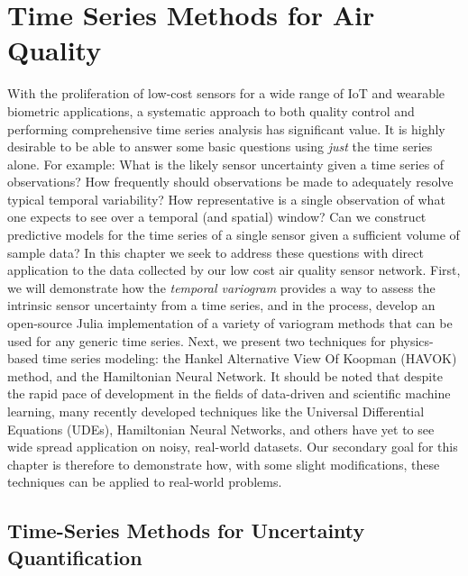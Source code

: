 \chapter{Time Series Methods for Air Quality}

With the proliferation of low-cost sensors for a wide range of IoT and wearable biometric applications, a systematic approach to both quality control and performing comprehensive time series analysis has significant value. It is highly desirable to be able to answer some basic questions using \textit{just} the time series alone. For example: What is the likely sensor uncertainty given a time series of observations? How frequently should observations be made to adequately resolve typical temporal variability? How representative is a single observation of what one expects to see over a temporal (and spatial) window? Can we construct predictive models for the time series of a single sensor given a sufficient volume of sample data? In this chapter we seek to address these questions with direct application to the data collected by our low cost air quality sensor network. First, we will demonstrate how the \textit{temporal variogram} provides a way to assess the intrinsic sensor uncertainty from a time series, and in the process, develop an open-source Julia implementation of a variety of variogram methods that can be used for any generic time series. Next, we present two techniques for physics-based time series modeling: the Hankel Alternative View Of Koopman (HAVOK) method, and the Hamiltonian Neural Network. It should be noted that despite the rapid pace of development in the fields of data-driven and scientific machine learning, many recently developed techniques like the Universal Differential Equations (UDEs), Hamiltonian Neural Networks, and others have yet to see wide spread application on noisy, real-world datasets. Our secondary goal for this chapter is therefore to demonstrate how, with some slight modifications, these techniques can be applied to real-world problems.



\section{Time-Series Methods for Uncertainty Quantification}

